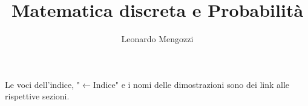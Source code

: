 \documentclass[12pt,a4paper]{article}
\title{Matematica discreta e Probabilità}
\author{Leonardo Mengozzi}
\date{}
\begin{document}
	\maketitle\thispagestyle{empty}

	\begin{center}
		\tiny Le voci dell'indice, "$\leftarrow$Indice" e i nomi delle dimostrazioni sono dei link alle rispettive sezioni.
	\end{center}

	\tableofcontents\label{toc}

	
	
	
\end{document}
